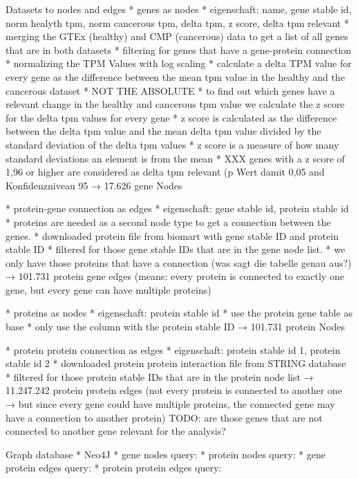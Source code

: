 \documentclass[11pt,a4paper]{article}
\begin{document}
{Datasets to nodes and edges
    * genes as nodes
        * eigenschaft: name, gene stable id, norm healyth tpm, norm cancerous tpm, delta tpm, z score, delta tpm relevant
        * merging the GTEx (healthy) and CMP (cancerous) data to get a list of all genes that are in both datasets
        * filtering for genes that have a gene-protein connection
        * normalizing the TPM Values with log scaling
        * calculate a delta TPM value for every gene as the difference between the mean tpm value in the healthy and the cancerous dataset
        * NOT THE ABSOLUTE
        * to find out which genes have a relevant change in the healthy and cancerous tpm value we calculate the z score for the delta tpm values for every gene
        * z score is calculated as the difference between the delta tpm value and the mean delta tpm value divided by the standard deviation of the delta tpm values
        * z score is a measure of how many standard deviations an element is from the mean
        * XXX genes with a z score of 1,96 or higher are considered as delta tpm relevant (p Wert damit 0,05 and Konfidenzniveau 95%
    → 17.626 gene Nodes

    * protein-gene connection as edges
        * eigenschaft: gene stable id, protein stable id
        * proteins are needed as a second node type to get a connection between the genes.
        * downloaded protein file from biomart with gene stable ID and protein stable ID
        * filtered for those gene stable IDs that are in the gene node list.
        * we only have those proteins that have a connection (was sagt die tabelle genau aus?)
    → 101.731 protein gene edges (means: every protein is connected to exactly one gene, but every gene can have multiple proteins)

    * proteins as nodes
        * eigenschaft: protein stable id
        * use the protein gene table as base
        * only use the column with the protein stable ID
    → 101.731 protein Nodes

    * protein protein connection as edges
        * eigenschaft: protein stable id 1, protein stable id 2
        * downloaded protein protein interaction file from STRING database
        * filtered for those protein stable IDs that are in the protein node list
    → 11.247.242 protein protein edges
    (not every protein is connected to another one → but since every gene could have multiple proteins, the connected gene may have a connection to another protein)
    TODO: are those genes that are not connected to another gene relevant for the analysis?

Graph database
    * Neo4J
    * gene nodes query:
    * protein nodes query:
    * gene protein edges query:
    * protein protein edges query:

}


\newpage
\end{document}

